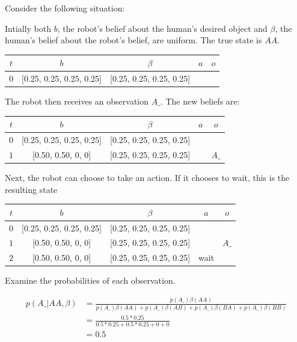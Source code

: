 \documentclass{article}
\begin{document}
Consider the following situation: 

Intially both $b$, the robot's belief about the human's desired object and $\beta$, the human's belief about the robot's belief, are uniform. The true state is $AA$. 

\begin{center}
\begin{tabular}{|c| c| c| c | c|}
	\hline
	$t$ & $b$ & $\beta$ & $a$ & $o$ \\
	\hline
	$0$ & [0.25, 0.25, 0.25, 0.25] & [0.25, 0.25, 0.25, 0.25] & & \\
	\hline
\end{tabular}
\end{center}


The robot then receives an observation $A\_$. The new beliefs are: 

\begin{center}
\begin{tabular}{|c| c| c| c | c|}
	\hline
	$t$ & $b$ & $\beta$ & $a$ & $o$ \\
	\hline
	$0$ & [0.25, 0.25, 0.25, 0.25] & [0.25, 0.25, 0.25, 0.25] & & \\
	\hline
	$1$ & [0.50, 0.50, 0, 0] & [0.25, 0.25, 0.25, 0.25] & & $A\_$ \\
	\hline
\end{tabular}
\end{center}

Next, the robot can choose to take an action. If it chooses to wait, this is the resulting state


\begin{center}
\begin{tabular}{|c| c| c| c | c|}
	\hline
	$t$ & $b$ & $\beta$ & $a$ & $o$ \\
	\hline
	$0$ & [0.25, 0.25, 0.25, 0.25] & [0.25, 0.25, 0.25, 0.25] & & \\
	\hline
	$1$ & [0.50, 0.50, 0, 0] & [0.25, 0.25, 0.25, 0.25] & & $A\_$ \\
	\hline
	$2$ & [0.50, 0.50, 0, 0] & [0.25, 0.25, 0.25, 0.25] & wait  &  \\
	\hline
\end{tabular}
\end{center}

Examine the probabilities of each observation.

\begin{align*}
	p(A\_ | AA, \beta) &= \frac{ p(A\_)\beta(AA) }{ p(A\_)\beta(AA) + p(A\_)\beta(AB) + p(A\_)\beta(BA) + p(A\_)\beta(BB)} \\
	&= \frac{0.5 * 0.25}{0.5 * 0.25 + 0.5 * 0.25 + 0 + 0} \\
	&= 0.5
\end{align*}
\end{document}
